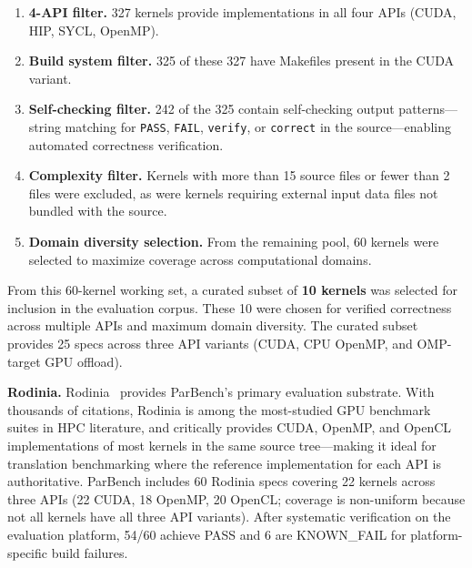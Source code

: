 \documentclass{article}
\begin{document}
\begin{enumerate}
\item \textbf{4-API filter.} 327 kernels provide implementations in all four APIs (CUDA, HIP, SYCL, OpenMP).
\item \textbf{Build system filter.} 325 of these 327 have Makefiles present in the CUDA variant.
\item \textbf{Self-checking filter.} 242 of the 325 contain self-checking output patterns---string matching for \texttt{PASS}, \texttt{FAIL}, \texttt{verify}, or \texttt{correct} in the source---enabling automated correctness verification.
\item \textbf{Complexity filter.} Kernels with more than 15 source files or fewer than 2 files were excluded, as were kernels requiring external input data files not bundled with the source.
\item \textbf{Domain diversity selection.} From the remaining pool, 60 kernels were selected to maximize coverage across computational domains.
\end{enumerate}

From this 60-kernel working set, a curated subset of \textbf{10 kernels} was selected for inclusion in the evaluation corpus. These 10 were chosen for verified correctness across multiple APIs and maximum domain diversity. The curated subset provides 25 specs across three API variants (CUDA, CPU OpenMP, and OMP-target GPU offload).

\textbf{Rodinia.} Rodinia~\cite{Rodinia2009} provides ParBench's primary evaluation substrate. With thousands of citations, Rodinia is among the most-studied GPU benchmark suites in HPC literature, and critically provides CUDA, OpenMP, and OpenCL implementations of most kernels in the same source tree---making it ideal for translation benchmarking where the reference implementation for each API is authoritative. ParBench includes 60 Rodinia specs covering 22 kernels across three APIs (22 CUDA, 18 OpenMP, 20 OpenCL; coverage is non-uniform because not all kernels have all three API variants). After systematic verification on the evaluation platform, 54/60 achieve PASS and 6 are KNOWN\_FAIL for platform-specific build failures.

\end{document}
